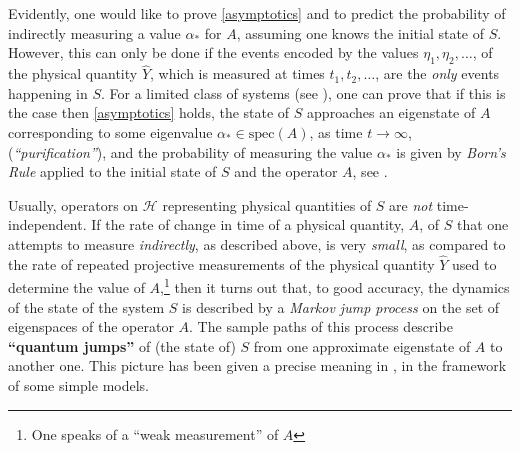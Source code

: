 \documentclass[a4paper,11pt]{article}
\begin{document}
Evidently, one would like to prove \eqref{asymptotics} and to predict the probability of indirectly measuring a value $\alpha_{*}$ for $A$, assuming one knows the initial state of $S$. However, this can only be done if the events encoded by the values 
$\eta_1, \eta_2, \dots$, of the physical quantity $\hat{Y}$, which is measured at times $t_1,t_2, \dots$, are the \textit{only} events happening in $S$. For a limited class of systems (see \cite{Bauer-Bernard, BFFS}), one can prove that if this is the case then \eqref{asymptotics} holds, the state of $S$ approaches an eigenstate of $A$ corresponding to some eigenvalue $\alpha_{*}\in \text{spec}(A)$, as time $t\rightarrow \infty$, (\textit{``purification''}), and the probability of measuring the value $\alpha_{*}$ is given by \textit{Born's Rule} applied to the initial state of $S$ and the operator $A$, see \cite{BFFS}.

Usually, operators on $\mathcal{H}$ representing physical quantities of $S$ are \textit{not} time-independent. If the rate of change in time of a physical quantity, $A$, of $S$ that one attempts to measure \textit{indirectly}, as described above, is very \textit{small}, as compared to the rate of repeated projective measurements of the physical quantity $\hat{Y}$ used to determine the value of $A$,\footnote{One speaks of a ``weak measurement'' of $A$} then it turns out that, to good accuracy, the dynamics of the state of the system $S$ is described by a \textit{Markov jump process} on the set of eigenspaces of the operator 
$A$. The sample paths of this process describe {\bf{``quantum jumps''}} of (the state of) $S$ from one approximate eigenstate
 of $A$ to another one. This picture has been given a precise meaning in \cite{BFFS, BCFFS-2}, in the framework of some simple models.\\
\end{document}
